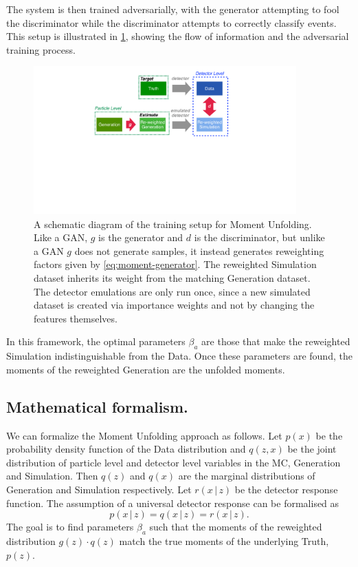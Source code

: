         The system is then trained adversarially, with the generator attempting to fool the discriminator while the discriminator attempts to correctly classify events.
        This setup is illustrated in \cref{fig:schematic}, showing the flow of information and the adversarial training process.
        \begin{figure}
    \centering
    \includegraphics[width=0.90\textwidth]{figures/chapter-05/Schematic_momentunfolding.pdf}
    \caption{A schematic diagram of the training setup for Moment Unfolding.  Like a GAN, $g$ is the generator and $d$ is the discriminator, but unlike a GAN $g$ does not generate samples, it instead generates reweighting factors given by \cref{eq:moment-generator}.  The reweighted Simulation dataset inherits its weight from the matching Generation dataset.  The detector emulations are only run once, since a new simulated dataset is created via importance weights and not by changing the features themselves.}
    \label{fig:schematic}
\end{figure}
        In this framework, the optimal parameters $\beta_a$ are those that make the reweighted Simulation indistinguishable from the Data.
        Once these parameters are found, the moments of the reweighted Generation are the unfolded moments.
    
    \subsection{Mathematical formalism.}
    
        We can formalize the Moment Unfolding approach as follows.
        Let $p(x)$ be the probability density function of the Data distribution and $q(z,x)$ be the joint distribution of particle level and detector level variables in the MC, Generation and Simulation.
        Then $q(z)$ and $q(x)$ are the marginal distributions of Generation and Simulation respectively.
        Let $r(x\,|\,z)$ be the detector response function.
        The assumption of a universal detector response can be formalised as
        \[
            p(x\,|\,z) = q(x\,|\,z) = r(x\,|\,z).
        \]
        The goal is to find parameters $\beta_a$ such that the moments of the reweighted distribution $g(z) \cdot q(z)$ match the true moments of the underlying Truth, \(p(z)\).

